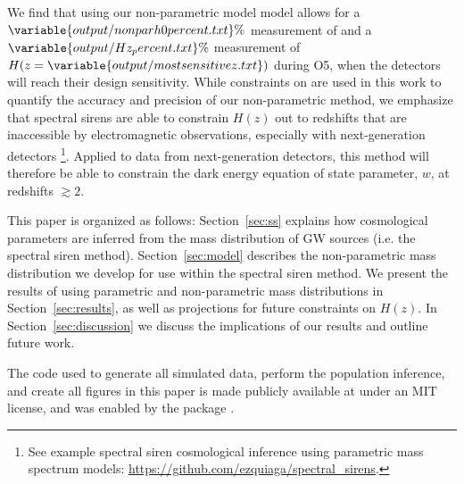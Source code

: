 \documentclass[]{aastex631}
\begin{document}
We find that using our non-parametric model model allows for a $\variable{output/nonparh0percent.txt}\%$ measurement of \Ho{} and a $\variable{output/Hz_percent.txt}\%$ measurement of $H(z=\variable{output/mostsensitivez.txt})$ during \ac{O5}, when the detectors will reach their design sensitivity. %
While constraints on \Ho{} are used in this work to quantify the accuracy and precision of our non-parametric method, we emphasize that spectral sirens are able to constrain $H(z)$ out to redshifts that are inaccessible by electromagnetic observations, especially with next-generation detectors \citep{ezquiaga_spectral_2022, Chen:2024gdn, You:2020wju}\footnote{See example spectral siren cosmological inference using parametric mass spectrum models: \href{https://github.com/ezquiaga/spectral_sirens}{https://github.com/ezquiaga/spectral\_sirens}.}.
Applied to data from next-generation detectors, this method will therefore be able to constrain the dark energy equation of state parameter, $w$, at redshifts $\gtrsim 2$.

This paper is organized as follows: Section~\ref{sec:ss} explains how cosmological parameters are inferred from the mass distribution of \ac{GW} sources (i.e. the spectral siren method).
Section~\ref{sec:model} describes the non-parametric mass distribution we develop for use within the spectral siren method.
We present the results of using parametric and non-parametric mass distributions in Section~\ref{sec:results}, as well as projections for future constraints on $H(z)$.
In Section~\ref{sec:discussion} we discuss the implications of our results and outline future work.

The code used to generate all simulated data, perform the population inference, and create all figures in this paper is made publicly available at \GitHubURL{} under an MIT license, and was enabled by the \showyourwork package \citep{Luger2021}.
\end{document}
